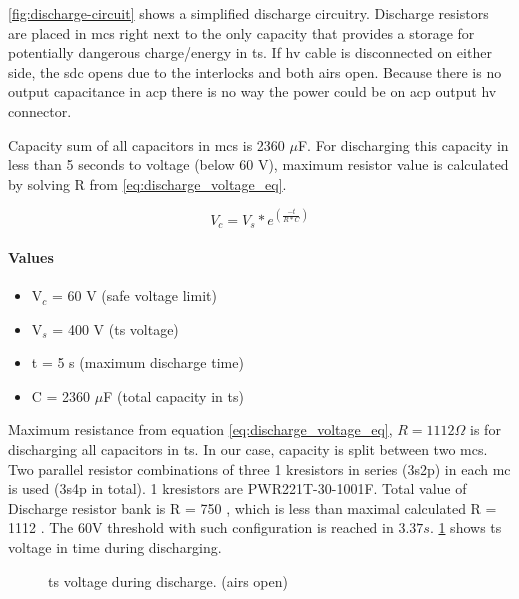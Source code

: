 \ref{fig:discharge-circuit} shows a simplified discharge circuitry. Discharge resistors are placed in \glspl{mc} right next to the only capacity that provides a storage for potentially dangerous charge/energy in \gls{ts}. If \gls{hv} cable is disconnected on either side, the \gls{sdc} opens due to the interlocks and both \glspl{air} open. Because there is no output capacitance in \gls{acp} there is no way the power could be on \gls{acp} output \gls{hv} connector.

Capacity sum of all capacitors in \glspl{mc} is 2360 $\mu$F. For discharging this capacity in less than 5 seconds to voltage (below 60 V), maximum resistor value is calculated by solving R from \ref{eq:discharge_voltage_eq}.

\begin{equation}
	V_{c}=V_{s}*e^{(\frac{-t}{R*C})}
	\label{eq:discharge_voltage_eq}
\end{equation}

\paragraph{Values}
\begin{itemize}
	\item V$_c$ = 60 V (safe voltage limit)
	\item V$_s$ = 400 V (\gls{ts} voltage)
	\item t = 5 s (maximum discharge time)
	\item C = 2360 $\mu$F (total capacity in \gls{ts})
\end{itemize}

Maximum resistance from equation \ref{eq:discharge_voltage_eq}, $R = 1112\Omega$ is for discharging all capacitors in \gls{ts}. In our case, capacity is split between two \glspl{mc}. Two parallel resistor combinations of three 1 k\ohm resistors in series (3s2p) in each \gls{mc} is used (3s4p in total). 1 k\ohm resistors are PWR221T-30-1001F. Total value of Discharge resistor bank is R = 750 \ohm, which is less than maximal calculated R = 1112 \ohm. The 60V threshold with such configuration is reached in $3.37s$. \ref{fig:discharge_voltage_time} shows \gls{ts} voltage in time during discharging.

\begin{figure}
	\caption{\gls{ts} voltage during discharge. (\glspl{air} open)}
	\label{fig:discharge_voltage_time}
\end{figure}


